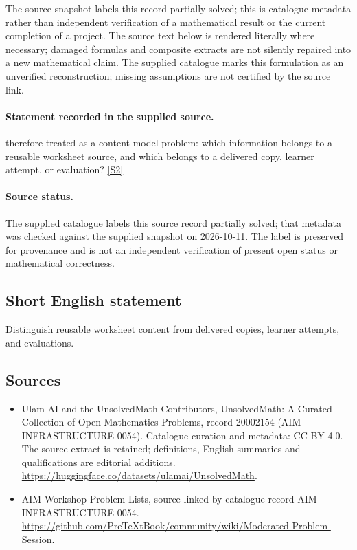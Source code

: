 \documentclass[11pt]{article}
\begin{document}
The source snapshot labels this record partially solved; this is catalogue metadata rather than independent verification of a mathematical result or the current completion of a project.
The source text below is rendered literally where necessary; damaged formulas and composite extracts are not silently repaired into a new mathematical claim.
The supplied catalogue marks this formulation as an unverified reconstruction; missing assumptions are not certified by the source link.
\paragraph{Statement recorded in the supplied source.}
therefore treated as a content-model problem: which information belongs to a
reusable worksheet source, and which belongs to a delivered copy, learner
attempt, or evaluation? \href{https://github.com/PreTeXtBook/community/wiki/Moderated-Problem-Session}{[S2]}
\paragraph{Source status.}
The supplied catalogue labels this source record partially solved; that metadata was checked against the supplied snapshot on 2026-10-11. The label is preserved for provenance and is not an independent verification of present open status or mathematical correctness.
\subsection{Short English statement}
Distinguish reusable worksheet content from delivered copies, learner attempts, and evaluations.
\subsection{Sources}
\begin{itemize}
\item[S1] Ulam AI and the UnsolvedMath Contributors, UnsolvedMath: A Curated Collection of Open Mathematics Problems, record 20002154 (AIM-INFRASTRUCTURE-0054). Catalogue curation and metadata: CC BY 4.0. The source extract is retained; definitions, English summaries and qualifications are editorial additions.
\url{https://huggingface.co/datasets/ulamai/UnsolvedMath}.
\item[S2] AIM Workshop Problem Lists, source linked by catalogue record AIM-INFRASTRUCTURE-0054.
\url{https://github.com/PreTeXtBook/community/wiki/Moderated-Problem-Session}.
\end{itemize}
\end{document}
